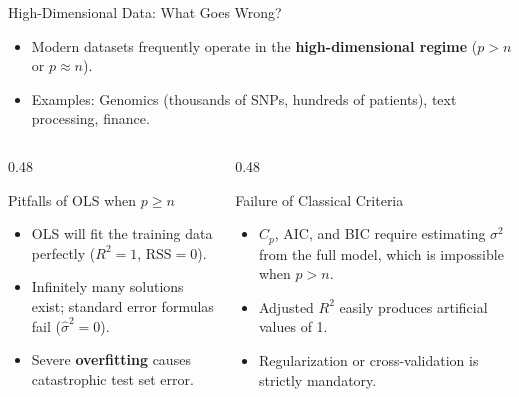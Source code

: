\documentclass[aspectratio=169, 11pt]{beamer}
\begin{document}
\begin{frame}{High-Dimensional Data: What Goes Wrong?}
    \begin{itemize}
        \item Modern datasets frequently operate in the \textbf{high-dimensional regime} ($p > n$ or $p \approx n$).
        \item Examples: Genomics (thousands of SNPs, hundreds of patients), text processing, finance.
    \end{itemize}
    \begin{columns}[T]
        \begin{column}{0.48\textwidth}
            \begin{alertblock}{Pitfalls of OLS when $p \ge n$}
                \begin{itemize}
                    \item OLS will fit the training data perfectly ($R^2 = 1$, $\text{RSS} = 0$).
                    \item Infinitely many solutions exist; standard error formulas fail ($\hat{\sigma}^2 = 0$).
                    \item Severe \textbf{overfitting} causes catastrophic test set error.
                \end{itemize}
            \end{alertblock}
        \end{column}

        \begin{column}{0.48\textwidth}
            \begin{alertblock}{Failure of Classical Criteria}
                \begin{itemize}
                    \item $C_p$, AIC, and BIC require estimating $\sigma^2$ from the full model, which is impossible when $p > n$.
                    \item Adjusted $R^2$ easily produces artificial values of 1.
                    \item Regularization or cross-validation is strictly mandatory.
                \end{itemize}
            \end{alertblock}
        \end{column}
    \end{columns}
\end{frame}
\end{document}
